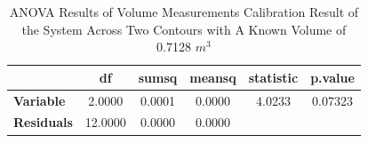 \begin{table}[H]
	\centering
	\caption{ANOVA Results of Volume Measurements Calibration Result of the System Across Two Contours with A Known Volume of 0.7128 $m^3$}
	\label{table-anova-3}
	\begin{tabular}{@{}lccccc@{}}
		\toprule
		                   & \textbf{df} & \textbf{sumsq} & \textbf{meansq} & \textbf{statistic} & \textbf{p.value} \\ \midrule
		\textbf{Variable}  & 2.0000      & 0.0001         & 0.0000          & 4.0233             & 0.07323          \\
		\textbf{Residuals} & 12.0000     & 0.0000         & 0.0000          &                    &                  \\ \bottomrule
	\end{tabular}%
\end{table}